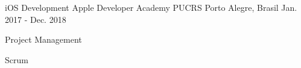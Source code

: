 \begin{cventries}
  \cventry
    {iOS Development}
    {Apple Developer Academy PUCRS}
    {Porto Alegre, Brasil}
    {Jan. 2017 - Dec. 2018}
    {
      \begin{cvitems}
        \item {Project Management}
        \item {Scrum}
      \end{cvitems}
    }
\end{cventries}
